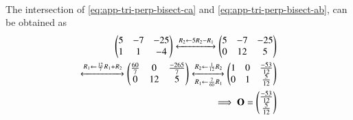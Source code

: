 \solution \\
The intersection of 
			\eqref{eq:app-tri-perp-bisect-ca}
			and
			\eqref{eq:app-tri-perp-bisect-ab},
			can be obtained as
\begin{align}
\begin{pmatrix}5&-7&-25\\1&1&-4\end{pmatrix} \xleftrightarrow[]{R_2 \leftarrow 5R_2 - R_1} \begin{pmatrix}5&-7&-25\\0&12&5\end{pmatrix}\\
 \xleftrightarrow[]{R_1\leftarrow \frac{12}{7}R_1 + R_2} \begin{pmatrix}\frac{60}{7}&0& \frac{-265}{7}\\0&12&5\end{pmatrix}
 \xleftrightarrow[R_1\leftarrow \frac{7}{60}R_1]{R_2 \leftarrow \frac{1}{12}R_2} \begin{pmatrix}1&0& \frac{-53}{12}\\0&1&\frac{5}{12}\end{pmatrix}\\
\implies \mathbf{O}=\begin{pmatrix}\frac{-53}{12}\\\frac{5}{12}\end{pmatrix}
			\label{eq:app-tri-perp-bisect-O}
\end{align}
